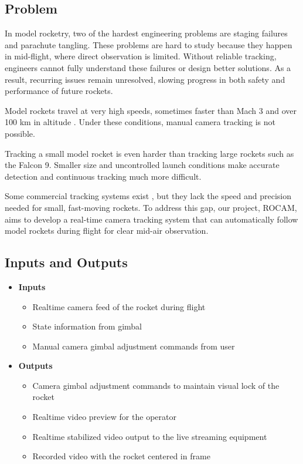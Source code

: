 \documentclass{article}
\begin{document}

\subsection{Problem}

In model rocketry, two of the hardest engineering problems are staging failures
and parachute tangling. These problems are hard to study because they happen in
mid-flight, where direct observation is limited. Without reliable tracking,
engineers cannot fully understand these failures or design better solutions. As
a result, recurring issues remain unresolved, slowing progress in both safety
and performance of future rockets.

Model rockets travel at very high speeds, sometimes faster than Mach 3 and over
100 km in altitude \citep{SpaceConcordiaRocketry2025}. Under these conditions,
manual camera tracking is not possible.

Tracking a small model rocket is even harder than tracking large rockets such as
the Falcon 9. Smaller size and uncontrolled launch conditions make accurate
detection and continuous tracking much more difficult.

Some commercial tracking systems exist \citep{AverTR3XX2021}, but they lack the
speed and precision needed for small, fast-moving rockets. To address this gap,
our project, ROCAM, aims to develop a real-time camera tracking system that can
automatically follow model rockets during flight for clear mid-air observation.


\subsection{Inputs and Outputs}
\begin{itemize}
  \item \textbf{Inputs}
        \begin{itemize}
          \item Realtime camera feed of the rocket during flight
          \item State information from gimbal
          \item Manual camera gimbal adjustment commands from user
        \end{itemize}

  \item \textbf{Outputs}
        \begin{itemize}
          \item Camera gimbal adjustment commands to maintain visual lock of the rocket
          \item Realtime video preview for the operator
          \item Realtime stabilized video output to the live streaming equipment
          \item Recorded video with the rocket centered in frame
        \end{itemize}
\end{itemize}
\end{document}

